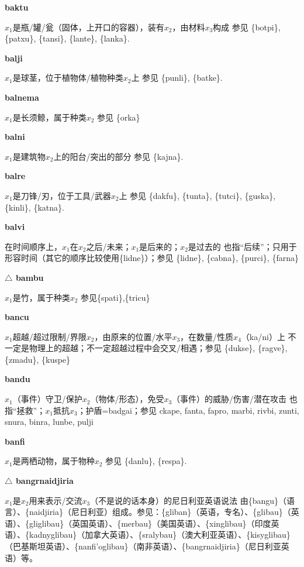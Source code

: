 \documentclass[notitlepage,twocolumn,a4paper,10pt]{book}
\begin{document}
{\sffamily\bfseries baktu} $x_1$是瓶\slash{}罐\slash{}瓮（固体，上开口的容器），装有$x_2$，由材料$x_3$构成 \textemdash{} 参见 \{botpi\}, \{patxu\}, \{tansi\}, \{lante\}, \{lanka\}.

{\sffamily\bfseries balji} $x_1$是球茎，位于植物体\slash{}植物种类$x_2$上 \textemdash{} 参见 \{punli\}, \{batke\}.

{\sffamily\bfseries balnema} $x_1$是长须鲸，属于种类$x_2$ \textemdash{} 参见 \{orka\}

{\sffamily\bfseries balni} $x_1$是建筑物$x_2$上的阳台\slash{}突出的部分 \textemdash{} 参见 \{kajna\}.

{\sffamily\bfseries balre}\enspace {\ttfamily\bfseries[        ba'e]}  $x_1$是刀锋\slash{}刃，位于工具\slash{}武器$x_2$上 \textemdash{} 参见 \{dakfu\}, \{tunta\}, \{tutci\}, \{guska\}, \{kinli\}, \{katna\}.

{\sffamily\bfseries balvi}\enspace {\ttfamily\bfseries[bav]}  在时间顺序上，$x_1$在$x_2$之后\slash{}未来；$x_1$是后来的；$x_2$是过去的 \textemdash{} 也指“后续”；只用于形容时间（其它的顺序比较使用\{lidne\}）；参见 \{lidne\}, \{cabna\}, \{purci\}, \{farna\}

{\sffamily\bfseries $\triangle$ bambu} $x_1$是竹，属于种类$x_2$ \textemdash{} 参见\{spati\},\{tricu\}

{\sffamily\bfseries bancu}\enspace {\ttfamily\bfseries[bac]}  $x_1$超越\slash{}超过限制\slash{}界限$x_2$，由原来的位置\slash{}水平$x_3$，在数量\slash{}性质$x_4$（ka\slash{}ni）上 \textemdash{} 不一定是物理上的超越；不一定超越过程中会交叉\slash{}相遇；参见 \{dukse\}, \{ragve\}, \{zmadu\}, \{kuspe\}

{\sffamily\bfseries bandu}\enspace {\ttfamily\bfseries[bad]}  $x_1$（事件）守卫\slash{}保护$x_2$（物体\slash{}形态），免受$x_3$（事件）的威胁\slash{}伤害\slash{}潜在攻击 \textemdash{} 也指“拯救”；$x_1$抵抗$x_3$；护盾={badgai}；参见 {ckape}, {fanta}, {fapro}, {marbi}, {rivbi}, {zunti}, {snura}, {binra}, {lunbe}, {pulji}

{\sffamily\bfseries banfi} $x_1$是两栖动物，属于物种$x_2$ \textemdash{} 参见 \{danlu\}, \{respa\}.

{\sffamily\bfseries $\triangle$ bangrnaidjiria} $x_1$是$x_2$用来表示\slash{}交流$x_3$（不是说的话本身）的尼日利亚英语说法 \textemdash{} 由\{bangu\}（语言）、\{naidjiria\}（尼日利亚）组成。参见：\{gliban\}（英语，专名）、\{glibau\}（英语）、\{gliglibau\}（英国英语）、\{merbau\}（美国英语）、\{xinglibau\}（印度英语）、\{kadnyglibau\}（加拿大英语）、\{sralybau\}（澳大利亚英语）、\{kisyglibau\}（巴基斯坦英语）、\{nanfi'oglibau\}（南非英语）、\{bangrnaidjiria\}（尼日利亚英语）等。
\end{document}
